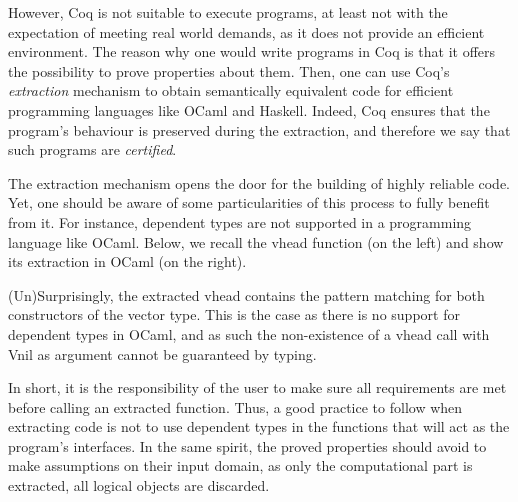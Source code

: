 	However, Coq is not suitable to execute programs, at least not with the expectation
	of meeting real world demands, as it does not provide an efficient environment. The reason
	why one would write programs in Coq is that it offers the possibility to prove properties
	about them. Then, one can use Coq's \textit{extraction} mechanism to obtain semantically equivalent
	code for efficient programming languages like OCaml and Haskell. Indeed, Coq
	ensures that the program's behaviour is preserved during the extraction, and therefore we say
	that such programs are \textit{certified}.
	
	The extraction mechanism opens the door for the building of highly reliable code. Yet, one
	should be aware of some particularities of this process to fully benefit from it. For instance,
	dependent types are not supported in a programming language like OCaml. Below, we
	recall the \textsf{vhead} function (on the left) and show its extraction in OCaml (on the right).	
	
	\begin{figure}[H]
	\begin{minipage}[b]{0.515\linewidth} 
	\centering
	
	\end{minipage}
	\hspace{0.05cm}
	\begin{minipage}[b]{0.5\linewidth} 
	\centering
	
	\end{minipage}
	\end{figure}	  		
	
	
	\noindent (Un)Surprisingly, the extracted \textsf{vhead} contains the pattern matching for
	both constructors of the \textsf{vector} type.	This is the case as there is no 
	support for dependent types in OCaml, and as such the non-existence
	of a \textsf{vhead} call with	\textsf{Vnil} as argument cannot be guaranteed by typing.
	
	In short, it is the responsibility of the user to make sure all requirements are met before calling
	an extracted function. Thus, a good practice to follow when extracting code is not to use
	dependent types in the functions that will act as the program's interfaces. In the same spirit,
	the proved properties should avoid to make assumptions on their input domain,
	as only the computational part is extracted, all logical objects are discarded.


